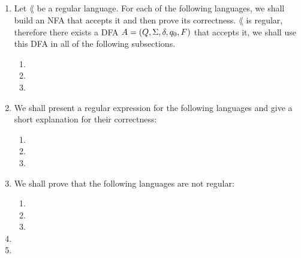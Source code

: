 \documentclass{article}
\title{
    \textmd{\bd{\hmwkClass:\ \hmwkTitle}}\\
}
\author{\hmwkAuthorName}
\begin{document}
\maketitle

\begin{enumerate}
      \item Let \(\lang\)  be a regular language. For each of the following languages,
            we shall build an NFA that accepts it and then prove its correctness.
            \(\lang\) is regular, therefore there exists a DFA \(A=(Q, \Sigma, \delta, q_0, F)\)
            that accepts it, we shall use this DFA in all of the following subsections.

            \begin{enumerate}
                  \item 
                  \item 
                  \item 
            \end{enumerate}

            \pagebreak

      \item We shall present a regular expression for the following languages and give a short
            explanation for their correctness:

            \begin{enumerate}
                  \item 
                  \item 
                  \item 
            \end{enumerate}

            \pagebreak

      \item We shall prove that the following languages are not regular:
            \begin{enumerate}
                  \item 
                  \item 
                  \item 
            \end{enumerate}

            \pagebreak

      \item 

      \item 


\end{enumerate}
\end{document}
